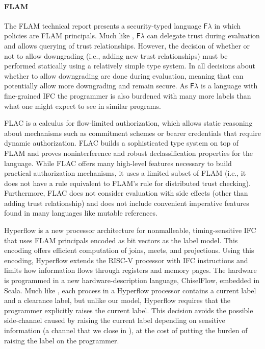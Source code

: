 \paragraph{FLAM}
The FLAM technical report \cite{flamtr} presents a security-typed language $\mathsf{F}\lambda$ in which policies are FLAM principals. Much like \lang{}, $\mathsf{F}\lambda$ can delegate trust during evaluation and allows querying of trust relationships. However, the decision of whether or not to allow downgrading (i.e., adding new trust relationships) must be performed statically using a relatively simple type system. In \lang{} all decisions about whether to allow downgrading are done during evaluation, meaning that \lang{} can potentially allow more downgrading and remain secure. As $\mathsf{F}\lambda$ is a language with fine-grained IFC the programmer is also burdened with many more labels than what one might expect to see in similar \lang{} programs.

FLAC \cite{7536372} is a calculus for flow-limited authorization, which allows static reasoning about mechanisms such as commitment schemes or bearer credentials that require dynamic authorization. FLAC builds a sophisticated type system on top of FLAM and proves noninterference and robust declassification properties for the language. While FLAC offers many high-level features necessary to build practical authorization mechanisms, it uses a limited subset of FLAM (i.e., it does not have a rule equivalent to FLAM's  rule for distributed trust checking). Furthermore, FLAC does not consider evaluation with side effects (other than adding trust relationship) and does not include convenient imperative features found in many languages like mutable references.

Hyperflow \cite{hyperflow} is a new processor architecture for nonmalleable, timing-sensitive IFC that uses FLAM principals encoded as bit vectors as the label model. This encoding offers efficient computation of joins, meets, and projections. Using this encoding, Hyperflow extends the RISC-V processor with IFC instructions and limits how information flows through registers and memory pages. The hardware is programmed in a new hardware-description language, ChiselFlow, embedded in Scala. Much like \lang{}, each process in a Hyperflow processor contains a current label and a clearance label, but unlike our model, Hyperflow requires that the programmer explicitly raises the current label. This decision avoids the possible side-channel caused by raising the current label depending on sensitive information (a channel that we close in \lang), at the cost of putting the burden of raising the label on the programmer.

